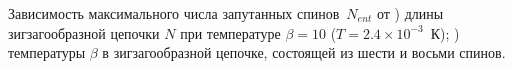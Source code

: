  Зависимость максимального числа запутанных спинов~$N_{ent}$ от
) длины зигзагообразной цепочки $N$ при температуре $\beta = 10$ ($T = 2.4\times 10^{-3}$~К);
) температуры $\beta$ в зигзагообразной цепочке, состоящей из шести и восьми спинов.